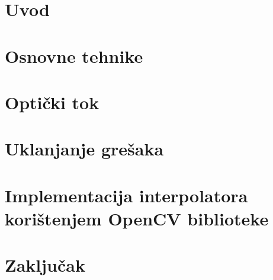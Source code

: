 \documentclass[12pt]{report}
\newcommand{\ch}{č}
\newcommand{\sh}{š}
\begin{document}
\tableofcontents

\chapter{Uvod}


\chapter{Osnovne tehnike}


\chapter{Opti\ch ki tok}


\chapter{Uklanjanje gre\sh aka}


\chapter{Implementacija interpolatora kori\sh tenjem OpenCV biblioteke}


\chapter{Zaklju\ch ak}

\end{document}
